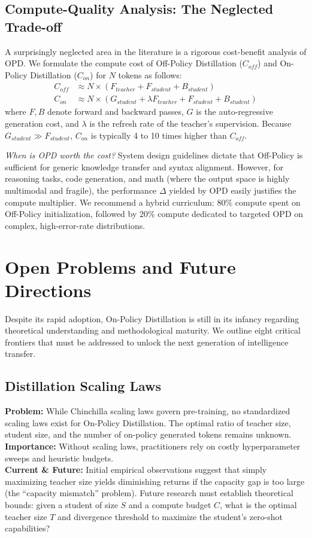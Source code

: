 \subsection{Compute-Quality Analysis: The Neglected Trade-off}
A surprisingly neglected area in the literature is a rigorous cost-benefit analysis of OPD. We formulate the compute cost of Off-Policy Distillation ($C_{off}$) and On-Policy Distillation ($C_{on}$) for $N$ tokens as follows:
\begin{align}
C_{off} &\approx N \times (F_{teacher} + F_{student} + B_{student}) \\
C_{on} &\approx N \times \left( G_{student} + \lambda F_{teacher} + F_{student} + B_{student} \right)
\end{align}
where $F, B$ denote forward and backward passes, $G$ is the auto-regressive generation cost, and $\lambda$ is the refresh rate of the teacher's supervision. Because $G_{student} \gg F_{student}$, $C_{on}$ is typically 4 to 10 times higher than $C_{off}$. 

\textit{When is OPD worth the cost?} System design guidelines dictate that Off-Policy is sufficient for generic knowledge transfer and syntax alignment. However, for reasoning tasks, code generation, and math (where the output space is highly multimodal and fragile), the performance $\Delta$ yielded by OPD easily justifies the compute multiplier. We recommend a hybrid curriculum: 80\% compute spent on Off-Policy initialization, followed by 20\% compute dedicated to targeted OPD on complex, high-error-rate distributions.

\section{Open Problems and Future Directions}
\label{sec:future}

Despite its rapid adoption, On-Policy Distillation is still in its infancy regarding theoretical understanding and methodological maturity. We outline eight critical frontiers that must be addressed to unlock the next generation of intelligence transfer.

\subsection{Distillation Scaling Laws}
\textbf{Problem:} While Chinchilla scaling laws govern pre-training, no standardized scaling laws exist for On-Policy Distillation. The optimal ratio of teacher size, student size, and the number of on-policy generated tokens remains unknown. \\
\textbf{Importance:} Without scaling laws, practitioners rely on costly hyperparameter sweeps and heuristic budgets. \\
\textbf{Current \& Future:} Initial empirical observations suggest that simply maximizing teacher size yields diminishing returns if the capacity gap is too large (the ``capacity mismatch'' problem). Future research must establish theoretical bounds: given a student of size $S$ and a compute budget $C$, what is the optimal teacher size $T$ and divergence threshold to maximize the student's zero-shot capabilities?

